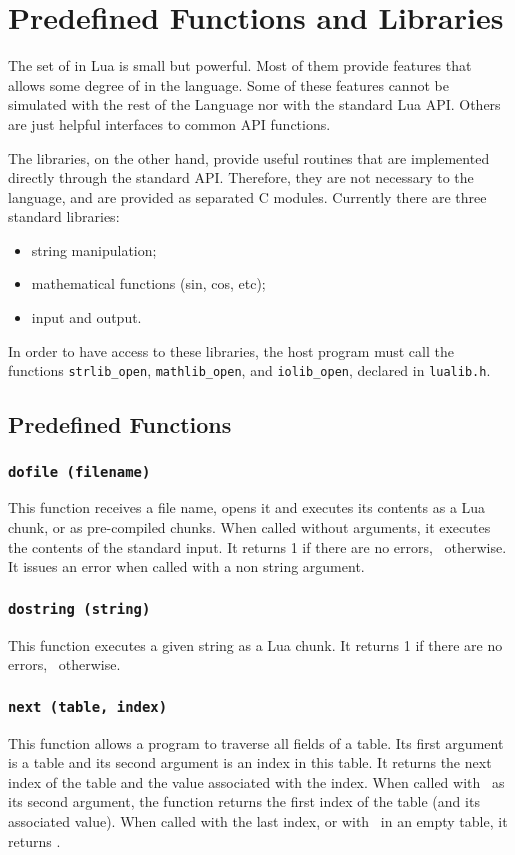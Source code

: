 \section{Predefined Functions and Libraries}

The set of  in Lua is small but powerful.
Most of them provide features that allows some degree of
 in the language.
Some of these features cannot be simulated with the rest of the
Language nor with the standard Lua API.
Others are just helpful interfaces to common API functions.

The libraries, on the other hand, provide useful routines
that are implemented directly through the standard API.
Therefore, they are not necessary to the language,
and are provided as separated C modules.
Currently there are three standard libraries:
\begin{itemize}
\item string manipulation;
\item mathematical functions (sin, cos, etc);
\item input and output.
\end{itemize}
In order to have access to these libraries,
the host program must call the functions
\verb-strlib_open-, \verb-mathlib_open-, and \verb-iolib_open-,
declared in \verb-lualib.h-.


\subsection{Predefined Functions}

\subsubsection*{{\tt dofile (filename)}}
This function receives a file name,
opens it and executes its contents as a Lua chunk,
or as pre-compiled chunks.
When called without arguments,
it executes the contents of the standard input.
It returns 1 if there are no errors, \nil\ otherwise.
It issues an error when called with a non string argument.

\subsubsection*{{\tt dostring (string)}}
This function executes a given string as a Lua chunk.
It returns 1 if there are no errors, \nil\ otherwise.

\subsubsection*{{\tt next (table, index)}}
This function allows a program to traverse all fields of a table.
Its first argument is a table and its second argument
is an index in this table.
It returns the next index of the table and the
value associated with the index.
When called with \nil\ as its second argument,
the function returns the first index
of the table (and its associated value).
When called with the last index, or with \nil\ in an empty table,
it returns \nil.

